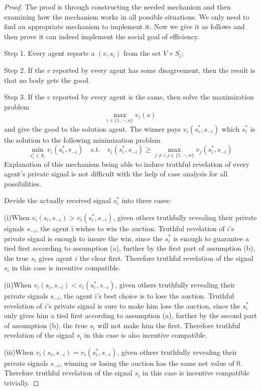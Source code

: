 \begin{proof}
The proof is through  constructing the needed mechanism and then examining how the mechanism works in all possible situations.
We only need to find an appropriate mechanism to implement it. Now we give it as follows and then prove it can indeed
 implement the social goal of efficiency.
 
 Step 1. Every agent reports a $(v,s_i)$ from the set $V\times S_i$;
 
 Step 2. If the $v$ reported by every agent has some disagreement, then the result is that no body gets the good.
 
 Step 3. If the $v$ reported by every agent is the same, then solve the maximization problem 
 $$\max_{i \in \{1,\cdots,n\}}v_i(s)$$
 and give the good to the solution agent. The winner pays $v_i(s_i^*, s_{-i})$ 
 which $s_i^*$ is the solution to the following minimization problem
 \begin{equation}
 \min_{s_i^*\in S_i} v_i(s_i^*, s_{-i})\quad
 s.t.\quad  v_i(s_i^*, s_{-i})\geqslant \max_{j\neq i, j \in \{1,\cdots,n\}} v_j(s_i^*, s_{-i})
 \end{equation}\label{pay}
Explanation of this mechanism being able to induce truthful revelation of every agent's private signal is not
difficult with the help of case analysis for all possibilities.

Devide the actually received signal $s_i^*$ into three cases:

(i)When $v_i(s_i, s_{-i})> v_i(s_i^*, s_{-i})$, given others truthfully revealing their private signals $s_{-i}$, the agent i
wishes to win the auction. Truthful revelation of $i$'s private signal is enough to insure the win, since the $s_i^*$
is enough to guarantee a tied first according to assumption (a), further by the first part of assumption (b), the true $s_i$ gives
agent $i$ the clear first. Therefore truthful revelation of the signal $s_i$ in this case is incentive compatible.

(ii)When $v_i(s_i, s_{-i})< v_i(s_i^*, s_{-i})$, given others truthfully revealing their private signals $s_{-i}$, the agent i's best choice is to lose the auction.
Truthful revelation of $i$'s private signal is sure to make him lose the auction, since  the $s_i^*$ only gives him a tied first according to assumption (a), 
further by the second part of assumption (b), the true $s_i$ will not make him the first. Therefore truthful revelation of the signal $s_i$ in this case is also incentive compatible.

(iii)When $v_i(s_i, s_{-i}) = v_i(s_i^*, s_{-i})$, given others truthfully revealing their private signals $s_{-i}$, winning or losing the auction has the same net value of 0. 
Therefore truthful revelation of the signal $s_i$ in this case is incentive compatible trivially.

\end{proof}




